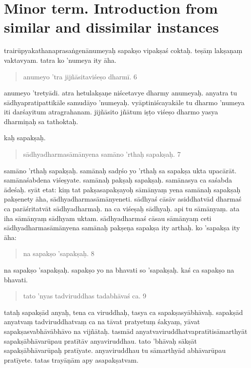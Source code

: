 \documentclass{article}
\begin{document}
\section{Minor term. Introduction from similar and dissimilar instances}
\pstart 
 trairūpyakathanaprasaṅgenānumeyaḥ sapakṣo vipakṣaś coktaḥ. teṣāṃ lakṣaṇaṃ vaktavyam. tatra ko 'numeya ity āha. 

 \begin{quote}
anumeyo 'tra jijñāsitaviśeṣo dharmī. 6
\end{quote}

anumeyo 'tretyādi. atra hetulakṣaṇe niścetavye dharmy anumeyaḥ. anyatra tu sādhyapratipattikāle samudāyo 'numeyaḥ. vyāptiniścayakāle tu dharmo 'numeya iti darśayitum atragrahanam. jijñāsito jñātum iṣṭo viśeṣo dharmo yasya dharmiṇaḥ sa tathoktaḥ.

kaḥ sapakṣaḥ.
\begin{quote}
sādhyadharmasāmānyena samāno 'rthaḥ sapakṣaḥ. 7
\end{quote}

samāno 'rthaḥ sapakṣaḥ. samānaḥ sadṛśo yo 'rthaḥ sa sapakṣa ukta upacārāt. samānaśabdena viśeṣyate. samānaḥ pakṣaḥ sapakṣaḥ. samānasya ca saśabda ādeśaḥ. 
 \pend
 \pstart
{}syāt etat: kiṃ tat pakṣasapakṣayoḥ sāmānyaṃ yena samānaḥ sapakṣaḥ pakṣenety āha, sādhyadharmasāmānyeneti. sādhyaś cāsāv asiddhatvād dharmaś ca parāśritatvāt sādhyadharmaḥ. na ca viśeṣaḥ sādhyaḥ. api tu sāmānyaṃ. ata iha sāmānyaṃ sādhyam uktam. sādhyadharmaś cāsau sāmānyaṃ ceti sādhyadharmasāmānyena samānaḥ pakṣeṇa sapakṣa ity arthaḥ.
\pend
\pstart
ko 'sapakṣa ity āha: 

\begin{quote}
na sapakṣo 'sapakṣaḥ. 8
\end{quote}

na sapakṣo 'sapakṣaḥ. sapakṣo yo na bhavati so 'sapakṣaḥ.
\pend
\pstart
kaś ca sapakṣo na bhavati.

\begin{quote}
tato 'nyas tadviruddhas tadabhāvaś ca. 9
\end{quote}

tataḥ sapakṣād anyaḥ, tena ca viruddhaḥ, tasya ca sapakṣasyābhāvaḥ. sapakṣād anyatvaṃ tadviruddhatvaṃ ca na tāvat pratyetuṃ śakyaṃ, yāvat sapakṣasvabhāvābhāvo na vijñātaḥ. tasmād anyatvaviruddhatvapratītisāmarthyāt sapakṣābhāvarūpau pratītāv anyaviruddhau.
\pend
\pstart
{}tato 'bhāvaḥ sākṣāt sapakṣābhāvarūpaḥ pratīyate. anyaviruddhau tu sāmarthyād abhāvarūpau pratīyete. tatas trayāṇām apy asapakṣatvam. 
\pend
{}\baselineskip
\endnumbering
\end{document}
